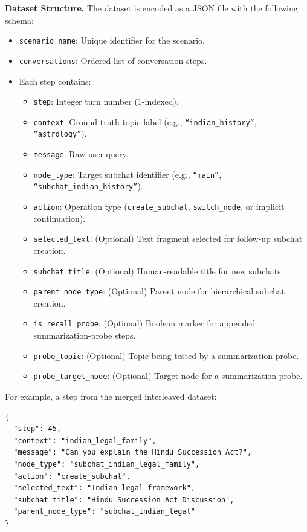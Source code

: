 \textbf{Dataset Structure.}
The dataset is encoded as a JSON file with the following schema:
\begin{itemize}
    \item \texttt{scenario\_name}: Unique identifier for the scenario.
    \item \texttt{conversations}: Ordered list of conversation steps.
    \item Each step contains:
    \begin{itemize}
        \item \texttt{step}: Integer turn number (1-indexed).
        \item \texttt{context}: Ground-truth topic label (e.g., \texttt{``indian\_history''}, \texttt{``astrology''}).
        \item \texttt{message}: Raw user query.
        \item \texttt{node\_type}: Target subchat identifier (e.g., \texttt{``main''}, \texttt{``subchat\_indian\_history''}).
        \item \texttt{action}: Operation type (\texttt{create\_subchat}, \texttt{switch\_node}, or implicit continuation).
        \item \texttt{selected\_text}: (Optional) Text fragment selected for follow-up subchat creation.
        \item \texttt{subchat\_title}: (Optional) Human-readable title for new subchats.
        \item \texttt{parent\_node\_type}: (Optional) Parent node for hierarchical subchat creation.
        \item \texttt{is\_recall\_probe}: (Optional) Boolean marker for appended summarization-probe steps.
        \item \texttt{probe\_topic}: (Optional) Topic being tested by a summarization probe.
        \item \texttt{probe\_target\_node}: (Optional) Target node for a summarization probe.
    \end{itemize}
\end{itemize}

For example, a step from the merged interleaved dataset:
\begin{verbatim}
{
  "step": 45,
  "context": "indian_legal_family",
  "message": "Can you explain the Hindu Succession Act?",
  "node_type": "subchat_indian_legal_family",
  "action": "create_subchat",
  "selected_text": "Indian legal framework",
  "subchat_title": "Hindu Succession Act Discussion",
  "parent_node_type": "subchat_indian_legal"
}
\end{verbatim}

